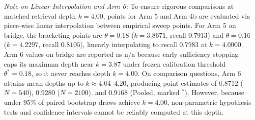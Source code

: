 \documentclass{article}
\begin{document}
\begin{table}[t]
\centering
\caption{\textbf{Table 2:} Matched-Depth Paragraph Recall at Exact Mean Depth $k=4.00$ Across Evaluation Cohorts}
\label{tab:matched_depth}
\vspace{1ex}
\begin{flushleft}
\footnotesize \textit{Note on Linear Interpolation and Arm 6:} To ensure rigorous comparisons at matched retrieval depth $k=4.00$, points for Arm 5 and Arm 4b are evaluated via piece-wise linear interpolation between empirical sweep points. For Arm 5 on bridge, the bracketing points are $\theta=0.18$ ($k=3.8671$, recall $0.7913$) and $\theta=0.16$ ($k=4.2297$, recall $0.8105$), linearly interpolating to recall $0.7983$ at $k=4.0000$. Arm 6 values on bridge are reported as n/a because early sufficiency stopping caps its maximum depth near $k=3.87$ under frozen calibration threshold $\theta^*=0.18$, so it never reaches depth $k=4.00$. On comparison questions, Arm 6 attains mean depths up to $k \approx 4.04\text{--}4.20$, producing point estimates of $0.8712$ ($N=540$), $0.9280$ ($N=2100$), and $0.9168$ (Pooled, marked $^*$). However, because under 95\% of paired bootstrap draws achieve $k=4.00$, non-parametric hypothesis tests and confidence intervals cannot be reliably computed at this depth.
\end{flushleft}
\end{table}
\end{document}
